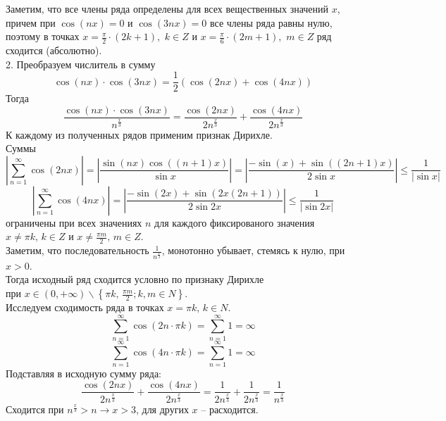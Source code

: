 \documentclass[a5paper, 10pt]{article}
\theoremstyle{definition}
\theoremstyle{plain}
\theoremstyle{remark}
\begin{document}
Заметим, что все члены ряда определены для всех вещественных значений $x$, причем при $\cos(nx) = 0$  и $\cos(3 nx) = 0$  все члены ряда равны нулю, поэтому \hypertarget{pdf}{в точках}  $x = \frac{\pi}{2} \cdot (2k + 1), \,\, k \in Z$  и $x = \frac{\pi}{6} \cdot (2m + 1), \,\, m \in Z$ ряд сходится (абсолютно).\\
2. Преобразуем числитель в сумму
\begin{equation*}
\cos( nx) \cdot \cos (3nx) = \frac{1}{2}\left( \cos(2nx) + \cos(4nx) \right)
\end{equation*}
Тогда
\begin{equation*}
\frac{\cos( nx) \cdot \cos (3nx) }{n^{\frac{x}{3}}} = \frac{\cos( 2nx) }{2n^{\frac{x}{3}}}+\frac{ \cos (4nx) }{2n^{\frac{x}{3}}}
\end{equation*}
К каждому из полученных рядов применим признак Дирихле.\\
Суммы 
\begin{equation*}
\left| \sum \limits_{n = 1}^{\infty} \cos( 2nx) \right| = \left| \frac{\sin (n x) \cos((n+1)x)}{\sin x} \right| =
 \left| \frac{-\sin (x) +  \sin((2n+1)x)}{2\sin x} \right| \leq \frac{1}{ \left|\sin x\right|}
\end{equation*}
\begin{equation*}
\left| \sum \limits_{n = 1}^{\infty} \cos( 4nx) \right| = \left| \frac{-\sin (2x) +  \sin(2x(2n+1))}{2\sin 2x} \right| \leq \frac{1}{ \left|\sin 2x\right|}
\end{equation*}
ограничены при всех значениях $n$ для каждого фиксированого значения $x \neq \pi k, \, k \in Z$ и $x \neq \frac{\pi m}{2}, \, m \in Z$.\\
Заметим, что  последовательность $\frac{1}{n^{\frac{x}{3}}}$, монотонно убывает, стемясь к нулю, при $x > 0$. \\
Тогда исходный ряд сходится условно по признаку Дирихле\\
 при $x \in (0, + \infty) \backslash \left\{\pi k, \, \frac{\pi m}{2};  k, m \in N \right\} $. \\

Исследуем сходимость ряда в точках $x = \pi k, \, k \in N$.
\begin{equation*}
\sum \limits_{n = 1}^{\infty} \cos( 2n\cdot \pi k) = \sum \limits_{n = 1}^{\infty} 1 = \infty
\end{equation*}
\begin{equation*}
\sum \limits_{n = 1}^{\infty} \cos( 4n\cdot \pi k) = \sum \limits_{n = 1}^{\infty} 1 = \infty
\end{equation*}
Подставляя в исходную сумму ряда:
\begin{equation*}
 \frac{\cos( 2nx) }{2n^{\frac{x}{3}}}+\frac{ \cos (4nx) }{2n^{\frac{x}{3}}} = \frac{1 }{2n^{\frac{x}{3}}}+\frac{1 }{2n^{\frac{x}{3}}} = \frac{1 }{n^{\frac{x}{3}}}
\end{equation*}
Сходится при $n^{\frac{x}{3}} > n \to x > 3$, для других $x$ -- расходится.\\
\end{document}
